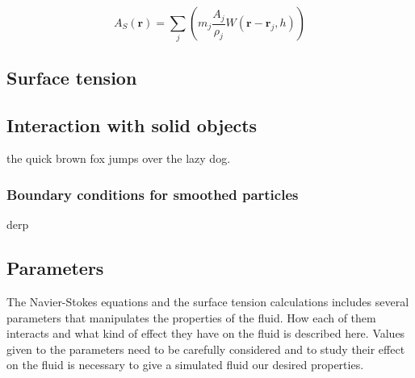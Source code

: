 \documentclass[paper=a4, fontsize=11pt]{report}
\numberwithin{equation}{section} %
\numberwithin{figure}{section} %
\numberwithin{table}{section} %
\begin{document}
        
%
%   

\begin{equation}
    A_S(\bm{r}) = \sum_{j}(m_j\frac{A_j}{\rho_j} W(\bm{r} - \bm{r}_j, h))
\end{equation}


\subsection{Surface tension}

\subsection{Interaction with solid objects}

the quick brown fox jumps over the lazy dog.

\subsubsection{Boundary conditions for smoothed particles}
derp

\subsection{Parameters}

The Navier-Stokes equations and the surface tension calculations includes several parameters that manipulates the properties of the fluid. How each of them interacts and what kind of effect they have on the fluid is described here. Values given to the parameters need to be carefully considered and to study their effect on the fluid is necessary to give a simulated fluid our desired properties.
\end{document}
